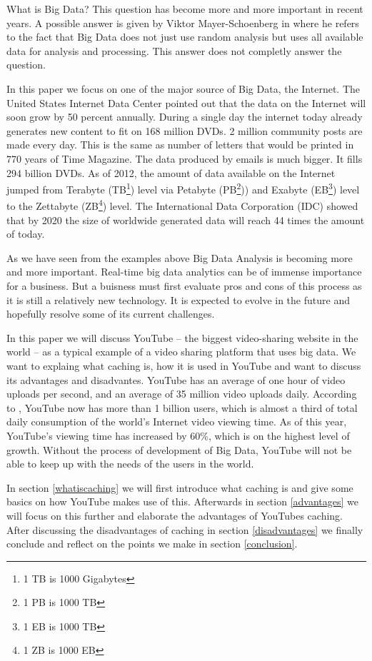 What is Big Data? This question has become more and more important in recent years. A possible answer is given by Viktor Mayer-Schoenberg in \cite{Mayer-Schnberger:2013:BDR:2588165} where he refers to the fact that Big Data does not just use random analysis but uses all available data for analysis and processing. This answer does not completly answer the question. 

In this paper we focus on one of the major source of Big Data, the Internet. 
The United States Internet Data Center pointed out that the data on the Internet will soon grow by 50 percent annually. During a single day the internet today already generates new content to fit on 168 million DVDs. 2 million community posts are made every day. This is the same as number of letters that would be printed in 770 years of Time Magazine. The data produced by emails is much bigger. It fills 294 billion DVDs. As of 2012, the amount of data available on the Internet jumped from Terabyte (TB\footnote{1 TB is 1000 Gigabytes}) level via Petabyte (PB\footnote{1 PB is 1000 TB})) and Exabyte (EB\footnote{1 EB is 1000 TB}) level to the Zettabyte (ZB\footnote{1 ZB is 1000 EB}) level. The International Data Corporation (IDC) showed that by 2020 the size of worldwide generated data will reach 44 times the amount of today. 

As we have seen from the examples above Big Data Analysis is becoming more and more important. Real-time big data analytics can be of immense importance for a business. But a buisness must first evaluate pros and cons of this process as it is still a relatively new technology. It is expected to evolve in the future and hopefully resolve some of its current challenges. 

In this paper we will discuss YouTube -- the biggest video-sharing website in the world -- as a typical example of a video sharing platform that uses big data. We want to explaing what caching is, how it is used in YouTube and want to discuss its advantages and disadvantes. YouTube has an average of one hour of video uploads per second, and an average of 35 million video uploads daily. According to \cite{expandedramblings:stats}, YouTube now has more than 1 billion users, which is almost a third of total daily consumption of the world's Internet video viewing time. As of this year, YouTube's viewing time has increased by 60\%, which is on the highest level of growth. Without the process of development of Big Data, YouTube will not be able to keep up with the needs of the users in the world. 

In section \ref{whatiscaching} we will first introduce what caching is and give some basics on how YouTube makes use of this. Afterwards in section \ref{advantages} we will focus on this further and elaborate the advantages of YouTubes caching. After discussing the disadvantages of caching in section \ref{disadvantages} we finally conclude and reflect on the points we make in section \ref{conclusion}. 
